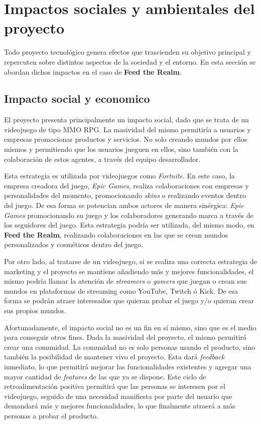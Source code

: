 \section{Impactos sociales y ambientales del proyecto}

Todo proyecto tecnológico genera efectos que trascienden su objetivo principal y repercuten sobre distintos
aspectos de la sociedad y el entorno. En esta sección se abordan dichos impactos en el caso de \textbf{Feed the Realm}.

\subsection{Impacto social y economico}

El proyecto presenta principalmente un impacto social, dado que se trata de un videojuego de tipo MMO RPG. La masividad 
del mismo permitiría a usuarios y empresas promocionar productos y servicios. No solo creando mundos por ellos mismos y 
permitiendo que los usuarios jueguen en ellos, sino también con la colaboración de estos agentes, a través del equipo 
desarrollador.
\vspace{0.25cm}

Esta estrategia es utilizada por videojuegos como \textit{Fortnite}. En este caso, la empresa creadora del juego, \textit{Epic Games}, 
realiza colaboraciones con empresas y personalidades del momento, promocionando \textit{skins} o realizando eventos dentro 
del juego. De esa forma se potencian ambos actores de manera sinérgica: \textit{Epic Games} promocionando su juego y los 
colaboradores generando marca a través de los seguidores del juego. Esta estrategia podría ser utilizada, del mismo modo, 
en \textbf{Feed the Realm}, realizando colaboraciones en las que se crean mundos personalizados y cosméticos dentro del 
juego.
\vspace{0.25cm}

Por otro lado, al tratarse de un videojuego, si se realiza una correcta estrategia de marketing y el proyecto se mantiene 
añadiendo más y mejores funcionalidades, el mismo podría llamar la atención de \textit{streamers} o \textit{gamers} que 
juegan o crean sus mundos en plataformas de streaming como YouTube, Twitch ó Kick. De esa forma 
se podrán atraer interesados que quieran probar el juego y/o quieran crear sus propios mundos.
\vspace{0.25cm}

Afortunadamente, el impacto social no es un fin en sí mismo, sino que es el medio para conseguir otros fines. Dada la masividad 
del proyecto, el mismo permitirá crear una comunidad. La comunidad no es solo personas usando el producto, sino también 
la posibilidad de mantener vivo el proyecto. Esta dará \textit{feedback} inmediato, lo que permitirá mejorar 
las funcionalidades existentes y agregar una mayor cantidad de \textit{features} de las que ya se dispone. Este ciclo de 
retroalimentación positiva permitirá que las personas se interesen por el videojuego, seguido de una necesidad manifiesta 
por parte del usuario que demandará más y mejores funcionalidades, lo que finalmente atraerá a más personas a probar el 
producto.
\vspace{0.25cm}

